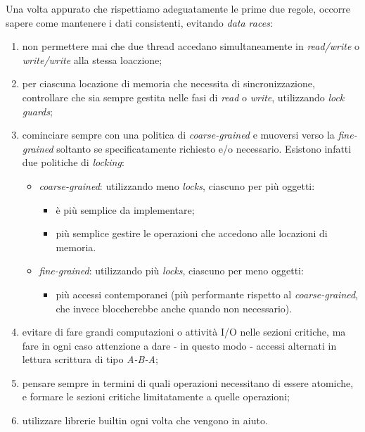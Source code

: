 Una volta appurato che rispettiamo adeguatamente le prime due regole, occorre sapere come mantenere i dati consistenti, evitando \textit{data races}:
\begin{enumerate}
	\item non permettere mai che due thread accedano simultaneamente in \textit{read/write} o \textit{write/write} alla stessa loaczione;
	\item per ciascuna locazione di memoria che necessita di sincronizzazione, controllare che sia sempre gestita nelle fasi di \textit{read} o \textit{write}, utilizzando \textit{lock guards};
	\item cominciare sempre con una politica di \textit{coarse-grained} e muoversi verso la \textit{fine-grained} soltanto se specificatamente richiesto e/o necessario. Esistono infatti due politiche di \textit{locking}:
	\begin{itemize}
		\item \textit{coarse-grained}: utilizzando meno \textit{locks}, ciascuno per più oggetti:
		\begin{itemize}
			\item è più semplice da implementare;
			\item più semplice gestire le operazioni che accedono alle locazioni di memoria.
		\end{itemize}
		\item \textit{fine-grained}: utilizzando più \textit{locks}, ciascuno per meno oggetti:
		\begin{itemize}
			\item più accessi contemporanei (più performante rispetto al \textit{coarse-grained}, che invece bloccherebbe anche quando non necessario).
		\end{itemize}
	\end{itemize}
	\item evitare di fare grandi computazioni o attività I/O nelle sezioni critiche, ma fare in ogni caso attenzione a dare - in questo modo - accessi alternati in lettura scrittura di tipo \textit{A-B-A};
	\item pensare sempre in termini di quali operazioni necessitano di essere atomiche, e formare le sezioni critiche limitatamente a quelle operazioni;
	\item utilizzare librerie builtin ogni volta che vengono in aiuto.
\end{enumerate}

